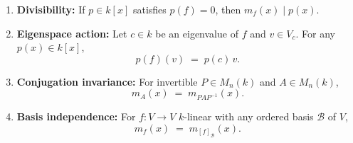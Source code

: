 \begin{tipbox}
\begin{enumerate}[leftmargin=1.5em, itemsep=4pt]
  \item \textbf{Divisibility:}  If $p \in k[x]$ satisfies $p(f) = 0$,
        then $m_f(x) \mid p(x)$.

  \item \textbf{Eigenspace action:}  Let $c \in k$ be an eigenvalue
        of $f$ and $v \in V_c$.  For any $p(x) \in k[x]$,
        \[
          p(f)(v) \;=\; p(c)\,v.
        \]

  \item \textbf{Conjugation invariance:}  For invertible $P \in M_{n}(k)$
        and $A \in M_{n}(k)$,
        \[
          m_A(x) \;=\; m_{PAP^{-1}}(x).
        \]

  \item \textbf{Basis independence:}  For $f \colon V \to V$ $k$-linear
        with any ordered basis $\mathcal{B}$ of $V$,
        \[
          m_f(x) \;=\; m_{[f]_{\mathcal{B}}}(x).
        \]
\end{enumerate}
\end{tipbox}

